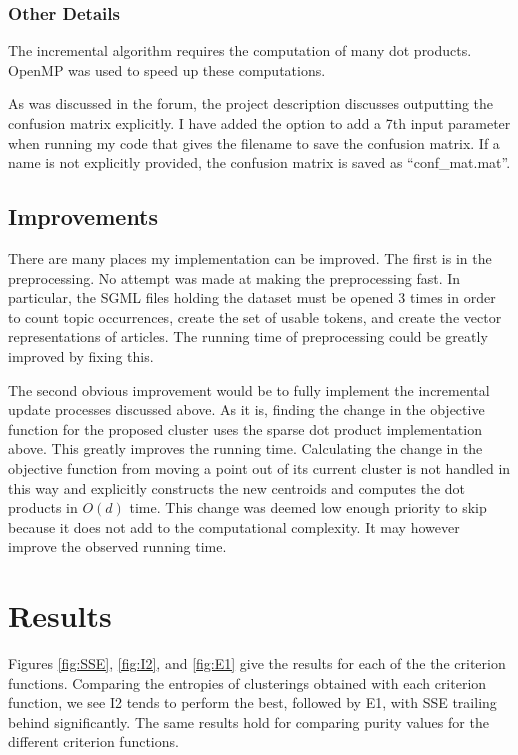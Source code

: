 \documentclass[11pt]{article}
\begin{document}
        \subsubsection{Other Details}
        The incremental algorithm requires the computation of many dot products. OpenMP was used to speed up these computations.

        As was discussed in the forum, the project description discusses outputting the confusion matrix explicitly. I have added the option to add a
        7th input parameter when running my code that gives the filename to save the confusion matrix. If a name is not explicitly provided, the
        confusion matrix is saved as ``conf\_mat.mat''.

        \subsection{Improvements}
        There are many places my implementation can be improved. The first is in the preprocessing. No attempt was made at making the preprocessing
        fast. In particular, the SGML files holding the dataset must be opened 3 times in order to count topic occurrences, create the set of usable
        tokens, and create the vector representations of articles. The running time of preprocessing could be greatly improved by fixing this.

        The second obvious improvement would be to fully implement the incremental update processes discussed above. As it is, finding the change in
        the objective function for the proposed cluster uses the sparse dot product implementation above. This greatly improves the running time.
        Calculating the change in the objective function from moving a point out of its current cluster is not handled in this way and explicitly
        constructs the new centroids and computes the dot products in $O(d)$ time. This change was deemed low enough priority to skip because it does
        not add to the computational complexity. It may however improve the observed running time.

    \section{Results}

    Figures \ref{fig:SSE}, \ref{fig:I2}, and \ref{fig:E1} give the results for each of the the criterion functions. Comparing the entropies of
    clusterings obtained with each criterion function, we see I2 tends to perform the best, followed by E1, with SSE trailing behind significantly.
    The same results hold for comparing purity values for the different criterion functions.
\end{document}
